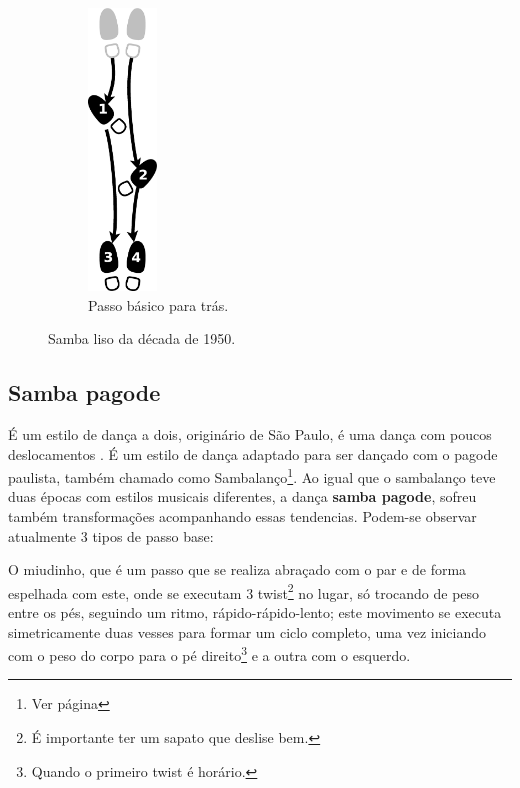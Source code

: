 \begin{figure}[h]
\begin{subfigure}[b]{0.3\textwidth}
	\includegraphics[width=0.2\textwidth]{chapters/cap-historia-dancasamba/samba-liso-basico-tras.eps}
        \caption{Passo básico para trás.}
        \label{fig:samba-liso-basico-tras}
    \end{subfigure}
    \caption{Samba liso da década de 1950.}\label{fig:samba-liso-basico}
\end{figure}

\subsection{Samba pagode} 
É um estilo de dança a dois, originário de São Paulo, 
é uma dança com poucos deslocamentos \cite[pp. 134]{perna2002samba}.
É um estilo de dança adaptado para ser dançado com o pagode paulista,
também chamado como Sambalanço\footnote{Ver página \pageref{ref:sambalanco}}.
Ao igual que o sambalanço teve duas épocas com estilos musicais diferentes,
a dança \textbf{samba pagode}, sofreu também transformações acompanhando essas tendencias.
Podem-se observar atualmente 3 tipos de passo base: 

O miudinho, que é um passo que se realiza abraçado com o par e de forma espelhada com este,
onde se executam 3 twist\footnote{É importante ter um sapato que deslise bem.} no lugar, 
só trocando de peso entre os pés, seguindo um ritmo, rápido-rápido-lento;
este movimento se executa simetricamente duas vesses para formar um ciclo completo,  
uma vez iniciando com o peso do corpo para o pé direito\footnote{Quando o primeiro twist é horário.} e a outra com o esquerdo.

